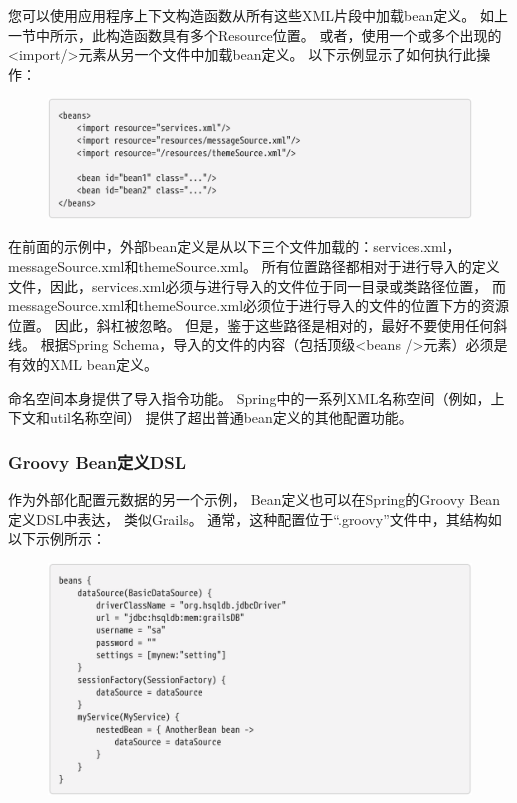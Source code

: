  您可以使用应用程序上下文构造函数从所有这些XML片段中加载bean定义。 
 如上一节中所示，此构造函数具有多个Resource位置。
  或者，使用一个或多个出现的<import/>元素从另一个文件中加载bean定义。 
  以下示例显示了如何执行此操作：

  \begin{figure}[ht]
    \centering
    \includegraphics[width=1\linewidth]{./Figure/IMG_code_5.png}
    \end{figure}

    在前面的示例中，外部bean定义是从以下三个文件加载的：services.xml，messageSource.xml和themeSource.xml。 
    所有位置路径都相对于进行导入的定义文件，因此，services.xml必须与进行导入的文件位于同一目录或类路径位置，
    而messageSource.xml和themeSource.xml必须位于进行导入的文件的位置下方的资源位置。 
    因此，斜杠被忽略。 但是，鉴于这些路径是相对的，最好不要使用任何斜线。 
    根据Spring Schema，导入的文件的内容（包括顶级<beans />元素）必须是有效的XML bean定义。

    命名空间本身提供了导入指令功能。 
    Spring中的一系列XML名称空间（例如，上下文和util名称空间）
    提供了超出普通bean定义的其他配置功能。

\subsubsection{Groovy Bean定义DSL}
作为外部化配置元数据的另一个示例，
Bean定义也可以在Spring的Groovy Bean定义DSL中表达，
类似Grails。 
通常，这种配置位于“.groovy”文件中，其结构如以下示例所示：

\begin{figure}[ht]
    \centering
    \includegraphics[width=1\linewidth]{./Figure/IMG_code_6.png}
\end{figure}
    
